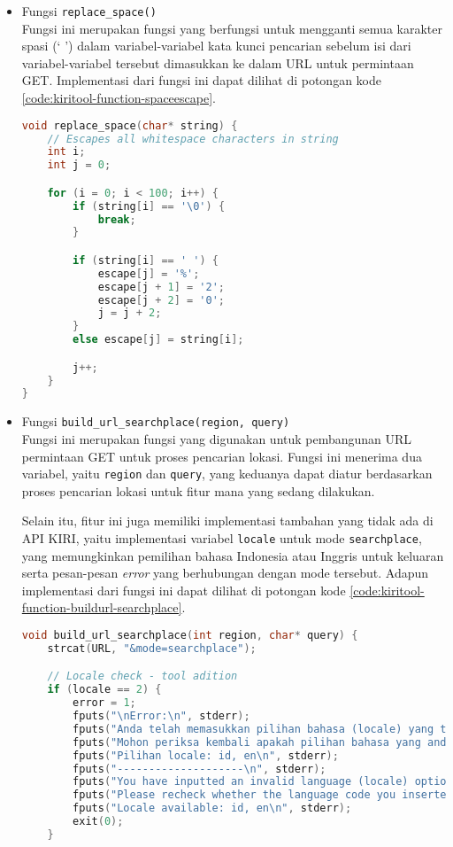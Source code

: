 \begin{itemize}[listparindent=\parindent]
	\item Fungsi \verb|replace_space()| \\
	Fungsi ini merupakan fungsi yang berfungsi untuk mengganti semua karakter spasi (` ') dalam variabel-variabel kata kunci pencarian sebelum isi dari variabel-variabel tersebut dimasukkan ke dalam URL untuk permintaan GET. Implementasi dari fungsi ini dapat dilihat di potongan kode \ref{code:kiritool-function-spaceescape}.
	
	\begin{lstlisting}[language=C, caption=Implementasi fungsi print\textunderscore help(), label=code:kiritool-function-spaceescape]
void replace_space(char* string) {
    // Escapes all whitespace characters in string
    int i;
    int j = 0;

    for (i = 0; i < 100; i++) {
        if (string[i] == '\0') {
            break;
        }

        if (string[i] == ' ') {
            escape[j] = '%';
            escape[j + 1] = '2';
            escape[j + 2] = '0';
            j = j + 2;
        }
        else escape[j] = string[i];

        j++;
    }
}
	\end{lstlisting}
	
	\item Fungsi \verb|build_url_searchplace(region, query)| \\
	Fungsi ini merupakan fungsi yang digunakan untuk pembangunan URL permintaan	GET untuk proses pencarian lokasi. Fungsi ini menerima dua variabel, yaitu \verb|region| dan \verb|query|, yang keduanya dapat diatur berdasarkan proses pencarian lokasi untuk fitur mana yang sedang dilakukan. 
	
	Selain itu, fitur ini juga memiliki implementasi tambahan yang tidak ada di API KIRI, yaitu implementasi variabel \verb|locale| untuk mode \verb|searchplace|, yang memungkinkan pemilihan bahasa Indonesia atau Inggris untuk keluaran serta pesan-pesan \textit{error} yang berhubungan dengan mode tersebut. Adapun implementasi dari fungsi ini dapat dilihat di potongan kode \ref{code:kiritool-function-buildurl-searchplace}.
	
	\begin{lstlisting}[language=C, caption=Implementasi fungsi build\textunderscore url\textunderscore searchplace(), label=code:kiritool-function-buildurl-searchplace]
	void build_url_searchplace(int region, char* query) {
    strcat(URL, "&mode=searchplace");

    // Locale check - tool adition
    if (locale == 2) {
        error = 1;
        fputs("\nError:\n", stderr);
        fputs("Anda telah memasukkan pilihan bahasa (locale) yang tidak valid.\n", stderr);
        fputs("Mohon periksa kembali apakah pilihan bahasa yang anda masukkan valid atau tidak.\n", stderr);
        fputs("Pilihan locale: id, en\n", stderr);
        fputs("--------------------\n", stderr);
        fputs("You have inputted an invalid language (locale) option.\n", stderr);
        fputs("Please recheck whether the language code you inserted was supported or not.\n", stderr);
        fputs("Locale available: id, en\n", stderr);
        exit(0);
    }


\end{lstlisting}
\end{itemize}
